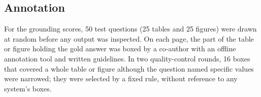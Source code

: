 \subsection{Annotation}

For the grounding scores, 50 test questions (25 tables and 25 figures) were drawn at
random before any output was inspected. On each page, the part of the table or figure
holding the gold answer was boxed by a co-author with an offline annotation tool and
written guidelines. In two quality-control rounds, 16 boxes that covered a whole table
or figure although the question named specific values were narrowed; they were
selected by a fixed rule, without reference to any system's boxes.
